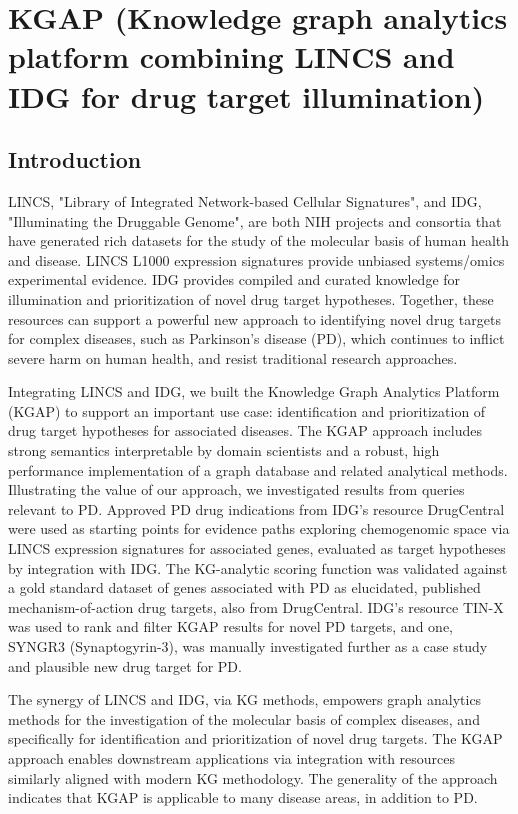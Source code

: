 \chapter{KGAP (Knowledge graph analytics platform combining LINCS and IDG for drug target illumination)}

\section{Introduction}

LINCS, "Library of Integrated Network-based Cellular Signatures", and IDG, "Illuminating the Druggable Genome", are both NIH projects and consortia that have generated rich datasets for the study of the molecular basis of human health and disease.  LINCS L1000 expression signatures provide unbiased systems/omics experimental evidence. IDG provides compiled and curated knowledge for illumination and prioritization of novel drug target hypotheses. Together, these resources can support a powerful new approach to identifying novel drug targets for complex diseases, such as Parkinson's disease (PD), which continues to inflict severe harm on human health, and resist traditional research approaches.

Integrating LINCS and IDG, we built the Knowledge Graph Analytics Platform (KGAP) to support an important use case: identification and prioritization of drug target hypotheses for associated diseases. The KGAP approach includes strong semantics interpretable by domain scientists and a robust, high performance implementation of a graph database and related analytical methods. Illustrating the value of our approach, we investigated results from queries relevant to PD. Approved PD drug indications from IDG’s resource DrugCentral were used as starting points for evidence paths exploring chemogenomic space via LINCS expression signatures for associated genes, evaluated as target hypotheses by integration with IDG. The KG-analytic scoring function was validated against a gold standard dataset of genes associated with PD as elucidated, published mechanism-of-action drug targets, also from DrugCentral. IDG's resource TIN-X was used to rank and filter KGAP results for novel PD targets, and one, SYNGR3 (Synaptogyrin-3), was manually investigated further as a case study and plausible new drug target for PD.

The synergy of LINCS and IDG, via KG methods, empowers graph analytics methods for the investigation of the molecular basis of complex diseases, and specifically for identification and prioritization of novel drug targets. The KGAP approach enables downstream applications via integration with resources similarly aligned with modern KG methodology. The generality of the approach indicates that KGAP is applicable to many disease areas, in addition to PD.

